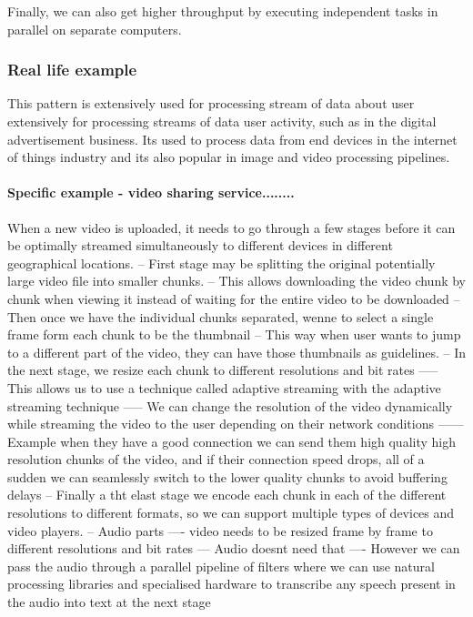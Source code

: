 \documentclass[a4paper, 11pt]{book}
\begin{document}
    Finally, we can also get higher throughput by executing independent tasks in parallel on separate computers.

    \subsubsection{Real life example}
    This pattern is extensively used for processing stream of data about user extensively for processing streams of data user activity, such as in the digital advertisement business.
    Its used to process data from end devices in the internet of things industry and its also popular in image and video processing pipelines.

    \paragraph{Specific example - video sharing service........}
    When a new video is uploaded, it needs to go through a few stages before it can be optimally streamed simultaneously to different devices in different geographical locations.
    -- First stage may be splitting the original potentially large video file into smaller chunks.
    -- This allows downloading the video chunk by chunk when viewing it instead of waiting for the entire video to be downloaded
    -- Then once we have the individual chunks separated, wenne to select a single frame form each chunk to be the thumbnail
    -- This way when user wants to jump to a different part of the video, they can have those thumbnails as guidelines.
    -- In the next stage, we resize each chunk to different resolutions and bit rates
    ----- This allows us to use a technique called adaptive streaming with the adaptive streaming technique
    ----- We can change the resolution of the video dynamically while streaming the video to the user depending on their network conditions
    ------ Example when they have a good connection we can send them high quality high resolution chunks of the video, and if their connection speed drops, all of a sudden we can seamlessly switch to the lower quality chunks to avoid buffering delays
    -- Finally a tht elast stage we encode each chunk in each of the different resolutions to different formats, so we can support multiple types of devices and video players.
    -- Audio parts
    ---- video needs to be resized frame by frame to different resolutions and bit rates
    --- Audio doesnt need that
    ---- However we can pass the audio through a parallel pipeline of filters where we can use natural processing libraries and specialised hardware to transcribe any speech present in the audio into text at the next stage
\end{document}
